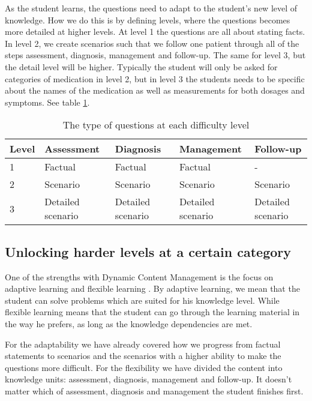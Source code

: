 As the student learns, the questions need to adapt to the student's new level of knowledge. How we do this is by defining levels, where the questions becomes more detailed at higher levels. At level 1 the questions are all about stating facts. In level 2, we create scenarios such that we follow one patient through all of the steps assessment, diagnosis, management and follow-up. The same for level 3, but the detail level will be higher. Typically the student will only be asked for categories of medication in level 2, but in level 3 the students needs to be specific about the names of the medication as well as measurements for both dosages and symptoms. See table \ref{table:ProgressionGranularity}.
\begin{table}[h!]
	\caption{The type of questions at each difficulty level}
	\label{table:ProgressionGranularity}
	
	\begin{tabular}{|m{2em}|m{6em}|m{6em}|m{6em}|m{6em}|}
		\hline
		Level & Assessment & Diagnosis & Management & Follow-up \\
		\hline
		1  & Factual & Factual & Factual & - \\
		2 & Scenario & Scenario & Scenario & Scenario \\
		3 & Detailed scenario  & Detailed scenario & Detailed scenario & Detailed scenario \\
		\hline
	\end{tabular}
\end{table}




\subsection{Unlocking harder levels at a certain category}
One of the strengths with Dynamic Content Management is the focus on adaptive learning and flexible learning \parencite{Eide2008}. By adaptive learning, we mean that the student can solve problems which are suited for his knowledge level. While flexible learning means that the student can go through the learning material in the way he prefers, as long as the knowledge dependencies are met.

For the adaptability we have already covered how we progress from factual statements to scenarios and the scenarios with a higher ability to make the questions more difficult. For the flexibility we have divided the content into knowledge units: assessment, diagnosis, management and follow-up. It doesn't matter which of assessment, diagnosis and management the student finishes first.


